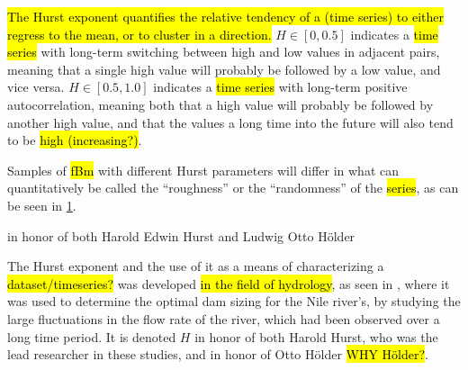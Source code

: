 \hl{The Hurst exponent quantifies the relative tendency of a (time series) to either regress to the mean, or to cluster in a direction.} $H\in[0,0.5]$ indicates a \hl{time series} with long-term switching between high and low values in adjacent pairs, meaning that a single high value will probably be followed by a low value, and vice versa. $H\in[0.5,1.0]$ indicates a \hl{time series} with long-term positive autocorrelation, meaning both that a high value will probably be followed by another high value, and that the values a long time into the future will also tend to be \hl{high (increasing?)}.

Samples of \hl{fBm} with different Hurst parameters will differ in what can quantitatively be called the ``roughness'' or the ``randomness'' of the \hl{series}, as can be seen in \cref{fig:fBm_examples}.

in honor of both Harold Edwin Hurst and Ludwig Otto H\"older

The Hurst exponent and the use of it as a means of characterizing a \hl{dataset/timeseries?} was developed \hl{in the field of hydrology}, as seen in \cite{hurst1951longterm,hurst1965longterm}, where it was used to determine the optimal dam sizing for the Nile river's, by studying the large fluctuations in the flow rate of the river, which had been observed over a long time period. It is denoted $H$ in honor of both Harold Hurst, who was the lead researcher in these studies, and in honor of Otto H\"older \hl{WHY H\"older?}.


%
\begin{figure}[htpb]%
    \centering%
    \caption{}%
    \label{fig:fBm_examples}%
\end{figure}%
\begin{figure}[htpb]%
    \centering%
    \caption{}%
\end{figure}%

